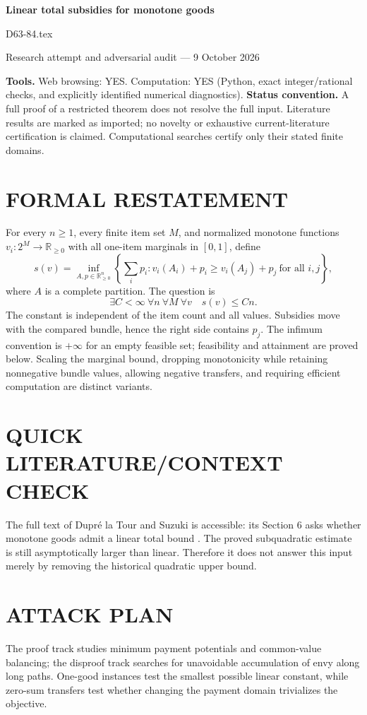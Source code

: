\documentclass[11pt,a4paper]{article}
\theoremstyle{remark}\newtheorem{remark}[theorem]{Remark}
\newcommand{\R}{\mathbb R}
\begin{document}
\begin{center}
{\LARGE\bfseries Linear total subsidies for monotone goods}\par\medskip
{\large D63-84.tex}\par
Research attempt and adversarial audit --- 9 October 2026
\end{center}
\label{problem:OP-0591}
\label{audited:ECON-004}
\label{audited:conventions}
\textbf{Tools.} Web browsing: YES. Computation: YES (Python, exact integer/rational checks, and explicitly identified numerical diagnostics).
\textbf{Status convention.} A full proof of a restricted theorem does not resolve the full input. Literature results are marked as imported; no novelty or exhaustive current-literature certification is claimed. Computational searches certify only their stated finite domains.

\section{FORMAL RESTATEMENT}
For every $n\ge1$, every finite item set $M$, and normalized monotone functions $v_i:2^M\to\R_{\ge0}$ with all one-item marginals in $[0,1]$, define
\[
s(v)=\inf_{A,p\in\R_{\ge0}^n}\left\{\sum_i p_i:
 v_i(A_i)+p_i\ge v_i(A_j)+p_j\ \text{for all }i,j\right\},
\]
where $A$ is a complete partition. The question is
\[
\exists C<\infty\ \forall n\ \forall M\ \forall v\quad s(v)\le Cn.
\]
The constant is independent of the item count and all values. Subsidies move with the compared bundle, hence the right side contains $p_j$. The infimum convention is $+\infty$ for an empty feasible set; feasibility and attainment are proved below. Scaling the marginal bound, dropping monotonicity while retaining nonnegative bundle values, allowing negative transfers, and requiring efficient computation are distinct variants.

\section{QUICK LITERATURE/CONTEXT CHECK}
The full text of Dupr\'e la Tour and Suzuki is accessible: its Section 6 asks whether monotone goods admit a linear total bound \cite{subq}. The proved subquadratic estimate is still asymptotically larger than linear. Therefore it does not answer this input merely by removing the historical quadratic upper bound.

\section{ATTACK PLAN}
The proof track studies minimum payment potentials and common-value balancing; the disproof track searches for unavoidable accumulation of envy along long paths. One-good instances test the smallest possible linear constant, while zero-sum transfers test whether changing the payment domain trivializes the objective.
\end{document}
